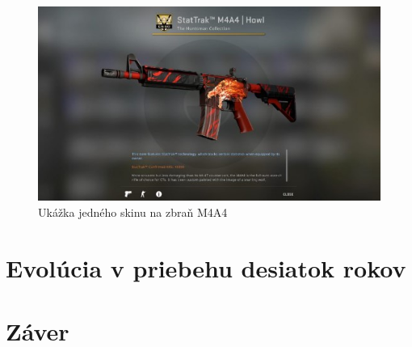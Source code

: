 \documentclass[10pt,twoside,slovak,a4paper]{article}
\begin{document}
\begin{figure}[tbh]
\centering
\includegraphics[scale=0.8]{skin.jpg}
\caption{Ukážka jedného skinu na zbraň M4A4}
\label{f:skiny}
\end{figure}


\section{Evolúcia v priebehu desiatok rokov} \label{evolucia}




\section{Záver} \label{zaver} %


%






\end{document}
